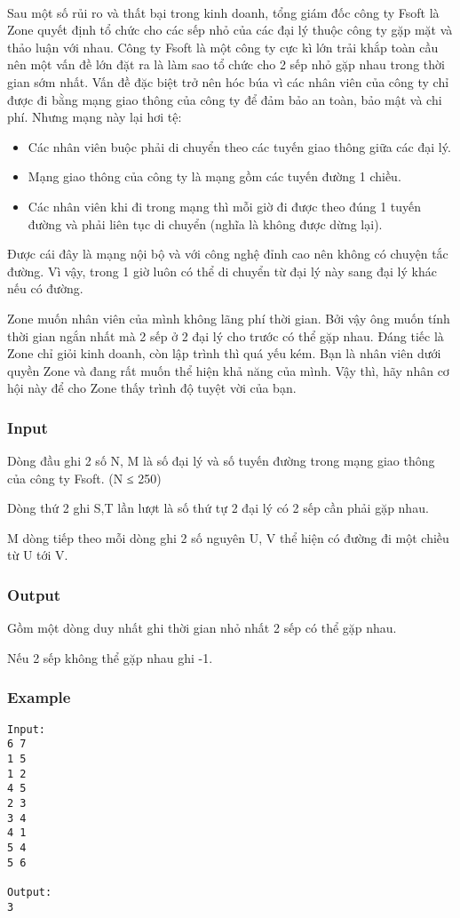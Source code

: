 

 

Sau một số rủi ro và thất bại trong kinh doanh, tổng giám đốc công ty Fsoft là Zone quyết định tổ chức cho các sếp nhỏ của các đại lý thuộc công ty gặp mặt và thảo luận với nhau. Công ty Fsoft là một công ty cực kì lớn trải khắp toàn cầu nên một vấn đề lớn đặt ra là làm sao tổ chức cho 2 sếp nhỏ gặp nhau trong thời gian sớm nhất. Vấn đề đặc biệt trở nên hóc búa vì các nhân viên của công ty chỉ được đi bằng mạng giao thông của công ty để đảm bảo an toàn, bảo mật và chi phí. Nhưng mạng này lại hơi tệ:
\begin{itemize}
	\item Các nhân viên buộc phải di chuyển theo các tuyến giao thông giữa các đại lý.
	\item Mạng giao thông của công ty là mạng gồm các tuyến đường 1 chiều.
	\item Các nhân viên khi đi trong mạng thì mỗi giờ đi được theo đúng 1 tuyến đường và phải liên tục di chuyển (nghĩa là không được dừng lại).
\end{itemize}

Được cái đây là mạng nội bộ và với công nghệ đỉnh cao nên không có chuyện tắc đường. Vì vậy, trong 1 giờ luôn có thể di chuyển từ đại lý này sang đại lý khác nếu có đường.

Zone muốn nhân viên của mình không lãng phí thời gian. Bởi vậy ông muốn tính thời gian ngắn nhất mà 2 sếp ở 2 đại lý cho trước có thể gặp nhau. Đáng tiếc là Zone chỉ giỏi kinh doanh, còn lập trình thì quá yếu kém. Bạn là nhân viên dưới quyền Zone và đang rất muốn thể hiện khả năng của mình. Vậy thì, hãy nhân cơ hội này để cho Zone thấy trình độ tuyệt vời của bạn.

\subsubsection{Input}

Dòng đầu ghi 2 số N, M là số đại lý và số tuyến đường trong mạng giao thông của công ty Fsoft. (N ≤ 250)

Dòng thứ 2 ghi S,T lần lượt là số thứ tự 2 đại lý có 2 sếp cần phải gặp nhau.

M dòng tiếp theo mỗi dòng ghi 2 số nguyên U, V thể hiện có đường đi một chiều từ U tới V.

\subsubsection{Output}

Gồm một dòng duy nhất ghi thời gian nhỏ nhất 2 sếp có thể gặp nhau.

Nếu 2 sếp không thể gặp nhau ghi -1.

\subsubsection{Example}
\begin{verbatim}
Input:
6 7
1 5
1 2
4 5
2 3
3 4
4 1
5 4
5 6

Output:
3
\end{verbatim}